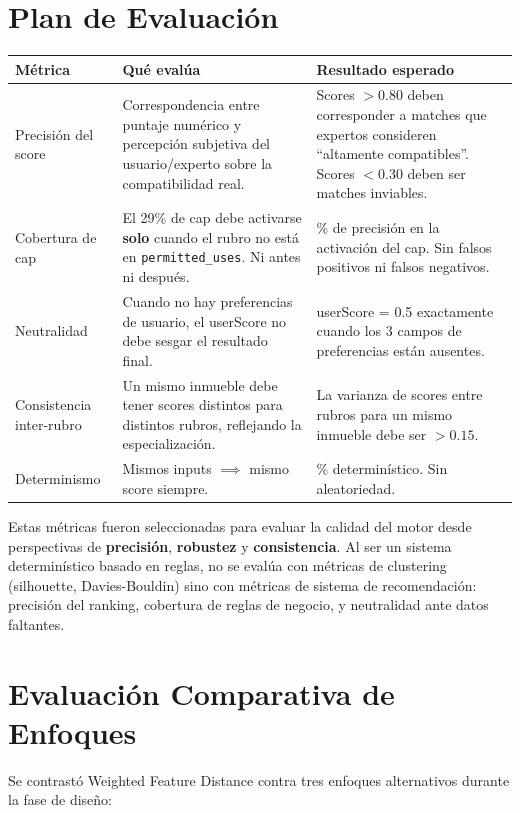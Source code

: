 \documentclass[11pt,a4paper]{article}
\begin{document}
\section{Plan de Evaluación}
\begin{table}[H]
    \centering
    \renewcommand{\arraystretch}{1.2}
    \begin{tabularx}{\textwidth}{>{\hsize=0.2\hsize}X >{\hsize=0.5\hsize}X >{\hsize=0.3\hsize}X}
        \toprule
        \textbf{Métrica} & \textbf{Qué evalúa} & \textbf{Resultado esperado} \\
        \midrule
        Precisión del score & Correspondencia entre puntaje numérico y percepción subjetiva del usuario/experto sobre la compatibilidad real. & Scores $>0.80$ deben corresponder a matches que expertos consideren ``altamente compatibles''. Scores $<0.30$ deben ser matches inviables. \\
        Cobertura de cap & El 29\% de cap debe activarse \textbf{solo} cuando el rubro no está en \texttt{permitted\_uses}. Ni antes ni después. & 100\% de precisión en la activación del cap. Sin falsos positivos ni falsos negativos. \\
        Neutralidad & Cuando no hay preferencias de usuario, el userScore no debe sesgar el resultado final. & userScore = 0.5 exactamente cuando los 3 campos de preferencias están ausentes. \\
        Consistencia inter-rubro & Un mismo inmueble debe tener scores distintos para distintos rubros, reflejando la especialización. & La varianza de scores entre rubros para un mismo inmueble debe ser $> 0.15$. \\
        Determinismo & Mismos inputs $\implies$ mismo score siempre. & 100\% determinístico. Sin aleatoriedad. \\
        \bottomrule
    \end{tabularx}
\end{table}

Estas métricas fueron seleccionadas para evaluar la calidad del motor desde perspectivas de \textbf{precisión}, \textbf{robustez} y \textbf{consistencia}. Al ser un sistema determinístico basado en reglas, no se evalúa con métricas de clustering (silhouette, Davies-Bouldin) sino con métricas de sistema de recomendación: precisión del ranking, cobertura de reglas de negocio, y neutralidad ante datos faltantes.

\section{Evaluación Comparativa de Enfoques}
Se contrastó Weighted Feature Distance contra tres enfoques alternativos durante la fase de diseño:
\end{document}
